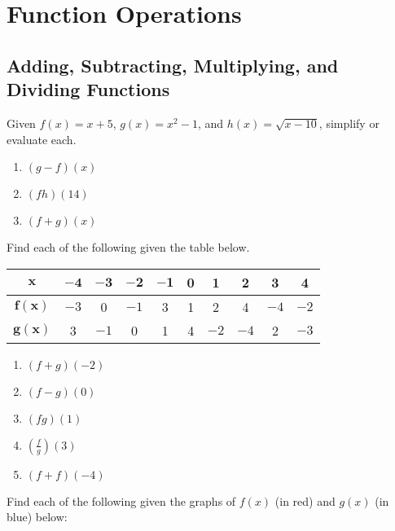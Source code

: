 \chapter{Function Operations}

\section{Adding, Subtracting, Multiplying, and Dividing Functions}

Given $f(x) = x + 5$, $g(x) = x^2 - 1$, and $h(x) = \sqrt{x-10}$, simplify or evaluate each.
\begin{enumerate}
    \item $(g-f)(x)$
    \item $(fh)(14)$
    \item $(f+g)(x)$
\setcounter{Review}{\value{enumi}}
\end{enumerate}

Find each of the following given the table below.
\begin{center}
\begin{tabular}{c|c|c|c|c|c|c|c|c|c}
    $\bm{x}$ & $\bm{-4}$ & $\bm{-3}$ & $\bm{-2}$ & $\bm{-1}$ & \textbf{0} & \textbf{1} & \textbf{2} & \textbf{3} & \textbf{4} \\ \hline
    $\bm{f(x)}$ & $-3$ & 0 & $-1$ & 3 & 1 & 2 & 4 & $-4$ & $-2$ \\ \hline
    $\bm{g(x)}$ & 3 & $-1$ & 0 & 1 & 4 & $-2$ & $-4$ & 2 & $-3$ \\
\end{tabular}
\end{center}

\begin{multicols}{5}
\begin{enumerate}	\setcounter{enumi}{\value{Review}}
	\item $(f + g)(-2)$
	\item $(f - g)(0)$
	\item $(fg)(1)$
	\item $\left(\frac{f}{g}\right)(3)$
	\item $(f + f)(-4)$
\setcounter{Review}{\value{enumi}}
\end{enumerate}
\end{multicols}

Find each of the following given the graphs of $f(x)$ (in red) and $g(x)$ (in blue) below:    \newline\\

